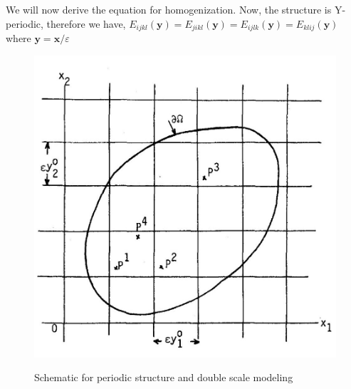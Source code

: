 \documentclass[10pt]{article}
\newcommand{\e}[1]{\textbf{#1}}
\newcommand{\fj}[2]{\frac{\partial #1}{\partial #2}}
\begin{document}
%
We will now derive the equation for homogenization. 
Now, the structure is Y-periodic, therefore we have, $E_{ijkl}(\e y) =E_{jikl}(\e y) =E_{ijlk}(\e y) =E_{klij}(\e y)$ where $\e y = \e x/\varepsilon$
\begin{figure}[H]
\begin{center}
	\includegraphics[scale=0.2]{./Plots/homo/2.jpg}
	\label{fig:doublescale}
	\caption{Schematic for periodic structure and double scale modeling}
\end{center}
\end{figure}
\end{document}
